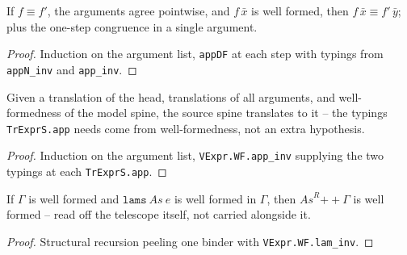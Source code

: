 \begin{lemma}
\label{vpc:thm:isdefequ-appn-prime}
\leanok
{}

 If $f \equiv f'$, the arguments agree pointwise, and $f\,\bar{x}$ is well formed,
then $f\,\bar{x} \equiv f'\,\bar{y}$; plus the one-step congruence in a single argument.
\end{lemma}
\begin{proof}\leanok
{}
 Induction on the argument list, \texttt{appDF} at each step with typings from
\texttt{appN\_inv} and \texttt{app\_inv}.
\end{proof}

\begin{lemma}
\label{vpc:thm:trexprs-appn}\leanok
{}

 Given a translation of the head, translations of all arguments, and
well-formedness of the model spine, the source spine translates to it -- the typings
\texttt{TrExprS.app} needs come from well-formedness, not an extra hypothesis.
\end{lemma}
\begin{proof}\leanok
{}
 Induction on the argument list, \texttt{VExpr.WF.app\_inv} supplying the two typings
at each \texttt{TrExprS.app}.
\end{proof}

\begin{lemma}
\label{vpc:thm:lams-ctx}\leanok
{}

 If $\Gamma$ is well formed and $\mathtt{lams}\ \mathit{As}\ e$ is well formed in
$\Gamma$, then $\mathit{As}^{R} \mathbin{+\!\!+} \Gamma$ is well formed -- read off the telescope
itself, not carried alongside it.
\end{lemma}
\begin{proof}\leanok
{}
 Structural recursion peeling one binder with \texttt{VExpr.WF.lam\_inv}.
\end{proof}

